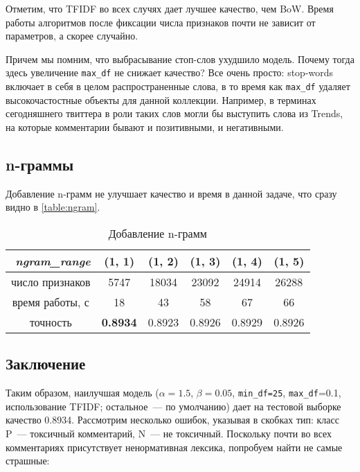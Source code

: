 \documentclass[12pt]{article}
\begin{document}
Отметим, что TFIDF во всех случях дает лучшее качество, чем BoW. Время работы алгоритмов после фиксации числа признаков почти не зависит от параметров, а скорее случайно.

Причем мы помним, что выбрасывание стоп-слов ухудшило модель. Почему тогда здесь увеличение \verb!max_df! не снижает качество? Все очень просто: stop-words включает в себя в целом распространенные слова, в то время как \verb!max_df! удаляет высокочастостные объекты для данной коллекции. Например, в терминах сегодняшнего твиттера в роли таких слов могли бы выступить слова из Trends, на которые комментарии бывают и позитивными, и негативными.

\subsection{n-граммы}
Добавление n-грамм не улучшает качество и время в данной задаче, что сразу видно в \autoref{table:ngram}.
\begin{table}[!h]
    \centering
    \begin{tabular}{@{}cccccc@{}}
    \toprule
    \multicolumn{1}{r}{\textit{ngram\_range}} & (1, 1) & (1, 2) & (1, 3) & (1, 4) & (1, 5) \\ \midrule
    число признаков                           & 5747   & 18034  & 23092  & 24914  & 26288  \\ \midrule
    время работы, с                           & 18     & 43     & 58     & 67     & 66     \\ \midrule
    точность                                  & \textbf{0.8934} & 0.8923 & 0.8926 & 0.8929 & 0.8926 \\ \bottomrule
    \end{tabular}
    \caption{Добавление n-грамм}
    \label{table:ngram}
\end{table}

\subsection{Заключение}
Таким образом, наилучшая модель ($\alpha=1.5$, $\beta=0.05$, \verb!min_df=25!, \verb!max_df!=0.1, использование TFIDF; остальное~--- по умолчанию) дает на тестовой выборке качество 0.8934. Рассмотрим несколько ошибок, указывая в скобках тип: класс P~--- токсичный комментарий, N~--- не токсичный. Поскольку почти во всех комментариях присутствует ненормативная лексика, попробуем найти не самые страшные:
\end{document}
